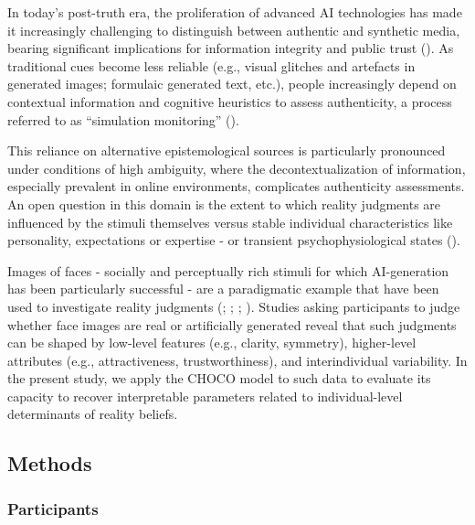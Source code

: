 \documentclass[
  jou,
  floatsintext,
  longtable,
  nolmodern,
  notxfonts,
  notimes,
  colorlinks=true,linkcolor=blue,citecolor=blue,urlcolor=blue]{apa7}
\begin{document}
In today's post-truth era, the proliferation of advanced AI technologies
has made it increasingly challenging to distinguish between authentic
and synthetic media, bearing significant implications for information
integrity and public trust
(). As
traditional cues become less reliable (e.g., visual glitches and
artefacts in generated images; formulaic generated text, etc.), people
increasingly depend on contextual information and cognitive heuristics
to assess authenticity, a process referred to as ``simulation
monitoring'' ().

This reliance on alternative epistemological sources is particularly
pronounced under conditions of high ambiguity, where the
decontextualization of information, especially prevalent in online
environments, complicates authenticity assessments. An open question in
this domain is the extent to which reality judgments are influenced by
the stimuli themselves versus stable individual characteristics like
personality, expectations or expertise - or transient
psychophysiological states ().

Images of faces - socially and perceptually rich stimuli for which
AI-generation has been particularly successful - are a paradigmatic
example that have been used to investigate reality judgments
(;
;
;
).
Studies asking participants to judge whether face images are real or
artificially generated reveal that such judgments can be shaped by
low-level features (e.g., clarity, symmetry), higher-level attributes
(e.g., attractiveness, trustworthiness), and interindividual
variability. In the present study, we apply the CHOCO model to such data
to evaluate its capacity to recover interpretable parameters related to
individual-level determinants of reality beliefs.

\subsection{Methods}\label{methods}

\subsubsection{Participants}\label{participants}
\end{document}
